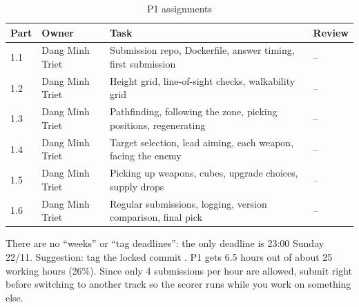 \documentclass[a4paper,12pt]{article}
\newcommand{\fn}[1]{\texttt{\detokenize{#1}}}
\begin{document}
\begin{table}[H]
\centering\small
\begin{tabularx}{\textwidth}{C{1cm}L{2.6cm}YC{1.6cm}}
\toprule
\textbf{Part} & \textbf{Owner} & \textbf{Task} & \textbf{Review} \\
 & Dang Minh Triet & Submission repo, Dockerfile, answer timing, first submission & -- \\
1.2 & Dang Minh Triet & Height grid, line-of-sight checks, walkability grid & -- \\
1.3 & Dang Minh Triet & Pathfinding, following the zone, picking positions, regenerating & -- \\
1.4 & Dang Minh Triet & Target selection, lead aiming, each weapon, facing the enemy & -- \\
1.5 & Dang Minh Triet & Picking up weapons, cubes, upgrade choices, supply drops & -- \\
1.6 & Dang Minh Triet & Regular submissions, logging, version comparison, final pick & -- \\
\bottomrule
\end{tabularx}
\caption{P1 assignments}
\end{table}

There are no ``weeks'' or ``tag deadlines'': the only deadline is 23:00 Sunday 22/11. Suggestion: tag the locked commit \fn{p1-final}. P1 gets 6.5 hours out of about 25 working hours (26\%). Since only 4 submissions per hour are allowed, submit right before switching to another track so the scorer runs while you work on something else.
\end{document}
